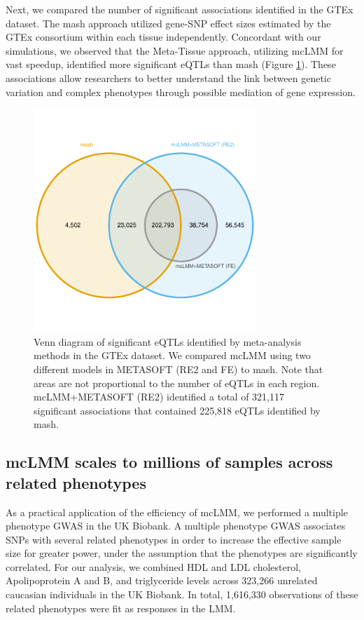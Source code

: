         Next, we compared the number of significant associations identified in the GTEx dataset. The mash approach utilized gene-SNP effect sizes estimated by the GTEx consortium within each tissue independently. Concordant with our simulations, we observed that the Meta-Tissue approach, utilizing mcLMM for vast speedup, identified more significant eQTLs than mash (Figure \ref{fig:fig3}). These associations allow researchers to better understand the link between genetic variation and complex phenotypes through possible mediation of gene expression. 
        
        \begin{figure}
            \centering
            \includegraphics[width=0.75\textwidth]{chapter3/figures/Figure_3.pdf}
            \caption{Venn diagram of significant eQTLs identified by meta-analysis methods in the GTEx dataset. We compared mcLMM using two different models in METASOFT (RE2 and FE) to mash. Note that areas are not proportional to the number of eQTLs in each region. mcLMM+METASOFT (RE2) identified a total of 321,117 significant associations that contained 225,818 eQTLs identified by mash.}
            \label{fig:fig3}
        \end{figure}
        
    \subsection{mcLMM scales to millions of samples across related phenotypes}
        As a practical application of the efficiency of mcLMM, we performed a multiple phenotype GWAS in the UK Biobank. A multiple phenotype GWAS associates SNPs with several related phenotypes in order to increase the effective sample size for greater power, under the assumption that the phenotypes are significantly correlated. For our analysis, we combined HDL and LDL cholesterol, Apolipoprotein A and B, and triglyceride levels across 323,266 unrelated caucasian individuals in the UK Biobank. In total, 1,616,330 observations of these related phenotypes were fit as responses in the LMM. 
        
